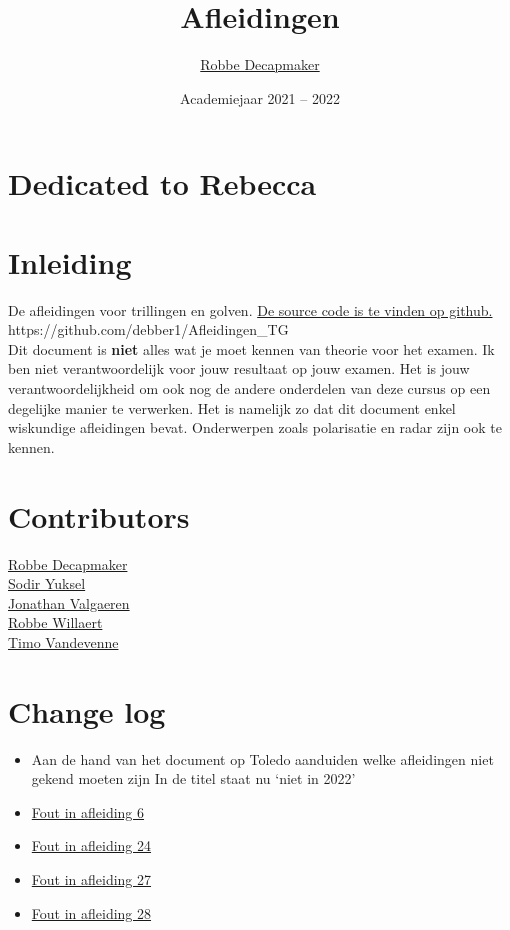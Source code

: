 \documentclass[a4paper,kul]{kulakarticle} %
\date{Academiejaar 2021 -- 2022}
\title{Afleidingen}
\author{\href{https://github.com/debber1}{Robbe Decapmaker}}
\begin{document}
\maketitle
\section*{Dedicated to Rebecca}
\section*{Inleiding}

De afleidingen voor trillingen en golven. \href{https://github.com/debber1/Afleidingen_TG}{De source code is te vinden op github.}\\
https://github.com/debber1/Afleidingen\_TG\\
\newline
Dit document is \textbf{niet} alles wat je moet kennen van theorie voor het examen. Ik ben niet verantwoordelijk voor jouw resultaat op jouw examen. Het is jouw verantwoordelijkheid om ook nog de andere onderdelen van deze cursus op een degelijke manier te verwerken. Het is namelijk zo dat dit document enkel wiskundige afleidingen bevat. Onderwerpen zoals polarisatie en radar zijn ook te kennen.\\

\section*{Contributors}
\href{https://github.com/debber1}{Robbe Decapmaker}\\
\href{https://github.com/sydon1}{Sodir Yuksel} \\
\href{https://github.com/ItsAlphie}{Jonathan Valgaeren}\\
\href{https://github.com/Robope}{Robbe Willaert}\\
\href{https://github.com/TimoNotThy}{Timo Vandevenne}
\section*{Change log}
\begin{itemize}
	\item Aan de hand van het document op Toledo aanduiden welke afleidingen niet gekend moeten zijn 
	\subitem In de titel staat nu `niet in 2022'
	\item \href{https://github.com/debber1/Afleidingen_TG/issues/16}{Fout in afleiding 6}
	\item \href{https://github.com/debber1/Afleidingen_TG/issues/17}{Fout in afleiding 24}
	\item \href{https://github.com/debber1/Afleidingen_TG/issues/18}{Fout in afleiding 27}
	\item \href{https://github.com/debber1/Afleidingen_TG/issues/19}{Fout in afleiding 28}
\end{itemize}
\newpage
\end{document}
